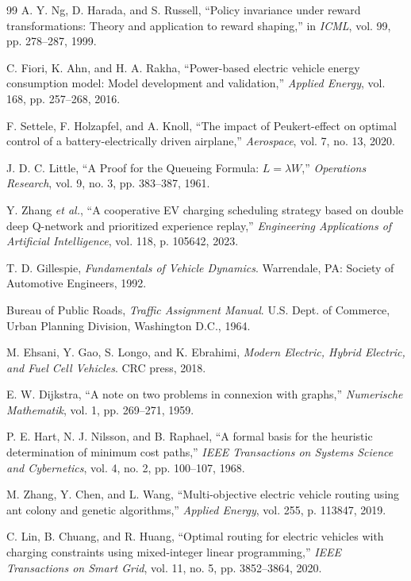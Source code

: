 \documentclass[conference]{IEEEtran}
\begin{document}
\begin{thebibliography}{99}
A. Y. Ng, D. Harada, and S. Russell, ``Policy invariance under reward transformations: Theory and application to reward shaping,'' in \textit{ICML}, vol. 99, pp. 278--287, 1999.

C. Fiori, K. Ahn, and H. A. Rakha, ``Power-based electric vehicle energy consumption model: Model development and validation,'' \textit{Applied Energy}, vol. 168, pp. 257--268, 2016.

F. Settele, F. Holzapfel, and A. Knoll, ``The impact of Peukert-effect on optimal control of a battery-electrically driven airplane,'' \textit{Aerospace}, vol. 7, no. 13, 2020.

J. D. C. Little, ``A Proof for the Queueing Formula: $L=\lambda W$,'' \textit{Operations Research}, vol. 9, no. 3, pp. 383--387, 1961.

Y. Zhang \textit{et al.}, ``A cooperative EV charging scheduling strategy based on double deep Q-network and prioritized experience replay,'' \textit{Engineering Applications of Artificial Intelligence}, vol. 118, p. 105642, 2023.

T. D. Gillespie, \textit{Fundamentals of Vehicle Dynamics}. Warrendale, PA: Society of Automotive Engineers, 1992.

Bureau of Public Roads, \textit{Traffic Assignment Manual}. U.S. Dept. of Commerce, Urban Planning Division, Washington D.C., 1964.

M. Ehsani, Y. Gao, S. Longo, and K. Ebrahimi, \textit{Modern Electric, Hybrid Electric, and Fuel Cell Vehicles}. CRC press, 2018.


E. W. Dijkstra, ``A note on two problems in connexion with graphs,'' \emph{Numerische Mathematik}, vol. 1, pp. 269--271, 1959.

P. E. Hart, N. J. Nilsson, and B. Raphael, ``A formal basis for the heuristic determination of minimum cost paths,'' \emph{IEEE Transactions on Systems Science and Cybernetics}, vol. 4, no. 2, pp. 100--107, 1968.

M. Zhang, Y. Chen, and L. Wang, ``Multi-objective electric vehicle routing using ant colony and genetic algorithms,'' \emph{Applied Energy}, vol. 255, p. 113847, 2019.

C. Lin, B. Chuang, and R. Huang, ``Optimal routing for electric vehicles with charging constraints using mixed-integer linear programming,'' \emph{IEEE Transactions on Smart Grid}, vol. 11, no. 5, pp. 3852--3864, 2020.


\end{thebibliography}
\end{document}
